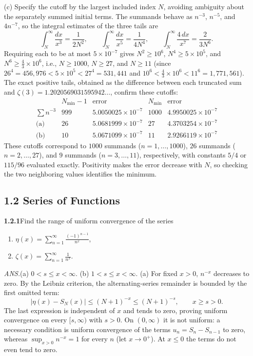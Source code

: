 (c) Specify the cutoff by the largest included index $N$, avoiding
ambiguity about the separately summed initial terms. The summands behave
as $n^{-3}$, $n^{-5}$, and $4n^{-7}$, so the integral estimates of the
three tails are
\[
 \int_N^\infty\frac{dx}{x^3}=\frac1{2N^2},\qquad
 \int_N^\infty\frac{dx}{x^5}=\frac1{4N^4},\qquad
 \int_N^\infty\frac{4\,dx}{x^7}=\frac2{3N^6}.
\]
Requiring each to be at most $5\times10^{-7}$ gives $N^2\ge10^6$,
$N^4\ge5\times10^5$, and $N^6\ge\frac43\times10^6$, i.e., $N\ge1000$,
$N\ge27$, and $N\ge11$ (since $26^4=456{,}976<5\times10^5<27^4=531{,}441$
and $10^6<\frac43\times10^6<11^6=1{,}771{,}561$). The exact positive
tails, obtained as the difference between each truncated sum and
$\zeta(3)=1.2020569031595942\ldots$, confirm these cutoffs:
\[
\begin{array}{c|rr|rr}
 &N_{\min}-1&\text{error}&N_{\min}&\text{error}\\ \hline
 \sum n^{-3}&999&5.0050025\times10^{-7}&1000&4.9950025\times10^{-7}\\
 \text{(a)}&26&5.0681999\times10^{-7}&27&4.3703254\times10^{-7}\\
 \text{(b)}&10&5.0671099\times10^{-7}&11&2.9266119\times10^{-7}
\end{array}
\]
These cutoffs correspond to $1000$ summands ($n=1,\ldots,1000$), $26$
summands ($n=2,\ldots,27$), and $9$ summands ($n=3,\ldots,11$),
respectively, with constants $5/4$ or $115/96$ evaluated exactly.
Positivity makes the error decrease with $N$, so checking the two
neighboring values identifies the minimum.


\subsection*{1.2 Series of Functions}

\par\bigskip
\noindent\textbf{1.2.1}\quad Find the range of uniform convergence of the
series
\begin{enumerate}
\item[(a)] $\displaystyle\eta(x)=\sum_{n=1}^{\infty}\frac{(-1)^{n-1}}{n^{x}}$,
\item[(b)] $\displaystyle\zeta(x)=\sum_{n=1}^{\infty}\frac{1}{n^{x}}$.
\end{enumerate}
\par\nobreak\hfill\emph{ANS.}\enspace (a) $0<s\leq x<\infty$.\quad
(b) $1<s\leq x<\infty$.
\solution
(a) For fixed $x>0$, $n^{-x}$ decreases to zero. By the Leibniz
criterion, the alternating-series remainder is bounded by the first
omitted term:
\[
 |\eta(x)-S_N(x)|\le(N+1)^{-x}\le(N+1)^{-s},\qquad x\ge s>0.
\]
The last expression is independent of $x$ and tends to zero, proving
uniform convergence on every $[s,\infty)$ with $s>0$. On $(0,\infty)$
it is not uniform: a necessary condition is uniform convergence of the
terms $u_n=S_n-S_{n-1}$ to zero, whereas $\sup_{x>0}n^{-x}=1$ for every
$n$ (let $x\to0^+$).
At $x\le0$ the terms do not even tend to zero.

